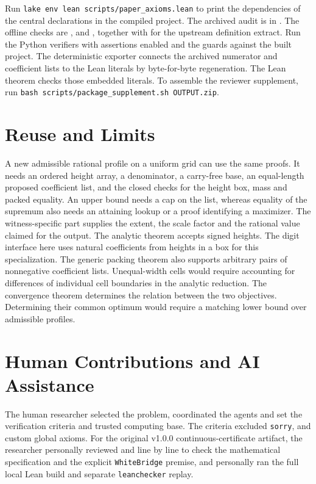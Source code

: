 \documentclass[sigplan,10pt,anonymous,review,balance=false]{acmart}
\newcommand{\leanid}[1]{\texttt{#1}}
\begin{document}
Run \leanid{lake env lean scripts/paper\_axioms.lean} to print
the dependencies of the central declarations in the compiled
project. The archived audit is in .
The offline checks are ,  and
, together with
 for the upstream definition
extract. Run the Python verifiers with assertions enabled and the guards
against the built project.
The deterministic exporter connects the archived numerator and coefficient lists
to the Lean literals by byte-for-byte regeneration. The Lean
theorem checks those embedded literals. To assemble the reviewer
supplement, run \leanid{bash scripts/package\_supplement.sh OUTPUT.zip}.



\section{Reuse and Limits}
\label{sec:reuse}

A new admissible rational profile on a uniform grid can use the
same proofs. It needs an ordered height array, a denominator,
a carry-free base, an equal-length proposed coefficient list,
and the closed checks for the height box, mass and packed
equality. An upper bound needs a cap on the list, whereas
equality of the supremum also needs an attaining lookup or
a proof identifying a maximizer. The witness-specific part
supplies the extent, the scale factor and the rational value
claimed for the output. The analytic theorem accepts signed
heights. The digit interface here uses natural coefficients
from heights in a box for this specialization. The generic
packing theorem also supports arbitrary pairs of nonnegative
coefficient lists. Unequal-width cells would require accounting
for differences of individual cell boundaries in the analytic
reduction. The convergence theorem determines the relation
between the two objectives. Determining their common optimum
would require a matching lower bound over admissible profiles.

\section*{Human Contributions and AI Assistance}

The human researcher selected the problem, coordinated the agents
and set the verification criteria and trusted computing base. The
criteria excluded \leanid{sorry},  and custom
global axioms. For the original v1.0.0 continuous-certificate artifact,
the researcher personally reviewed  and
 line by line to check the mathematical
specification and the explicit \leanid{WhiteBridge} premise, and
personally ran the full local Lean build and separate \leanid{leanchecker} replay.
\end{document}
